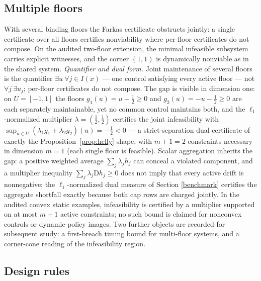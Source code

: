 \documentclass[10pt,twocolumn]{article}
\theoremstyle{definition}
\begin{document}
\subsection{Multiple floors}\label{floors}

With several binding floors the Farkas certificate obstructs jointly: a
single certificate over all floors certifies nonviability where
per-floor certificates do not compose. On the audited two-floor
extension, the minimal infeasible subsystem carries explicit
witnesses, and the corner \((1,1)\) is dynamically nonviable as in the shared system. \emph{Quantifier and dual form.} Joint maintenance of several floors is the quantifier \(\exists u\ \forall j \in I(x)\) --- one control satisfying every active floor --- not \(\forall j\ \exists u_j\); per-floor certificates do not compose. The gap is visible in dimension one: on \(U = [-1, 1]\) the floors \(g_1(u) = u - \tfrac12 \ge 0\) and \(g_2(u) = -u - \tfrac12 \ge 0\) are each separately maintainable, yet no common control maintains both, and the \(\ell_1\)-normalized multiplier \(\lambda = (\tfrac12, \tfrac12)\) certifies the joint infeasibility with \(\sup_{u \in U}(\lambda_1 g_1 + \lambda_2 g_2)(u) = -\tfrac12 < 0\) --- a strict-separation dual certificate of exactly the Proposition~\ref{prop:helly} shape, with \(m + 1 = 2\) constraints necessary in dimension \(m = 1\) (each single floor is feasible). Scalar aggregation inherits the gap: a positive weighted average \(\sum_j \lambda_j h_j\) can conceal a violated component, and a multiplier inequality \(\sum_j \lambda_j \mathrm{D}h_j \ge 0\) does not imply that every active drift is nonnegative; the \(\ell_1\)-normalized dual measure of Section \ref{benchmark} certifies the aggregate shortfall exactly because both cap rows are charged jointly. In the audited convex static examples, infeasibility is certified by a multiplier supported on at most \(m + 1\) active constraints; no such bound is claimed for nonconvex controls or dynamic-policy images. Two further objects are recorded for subsequent study: a
first-breach timing bound for multi-floor systems, and a corner-cone
reading of the infeasibility region.

\subsection{Design rules}\label{rules}
\end{document}
